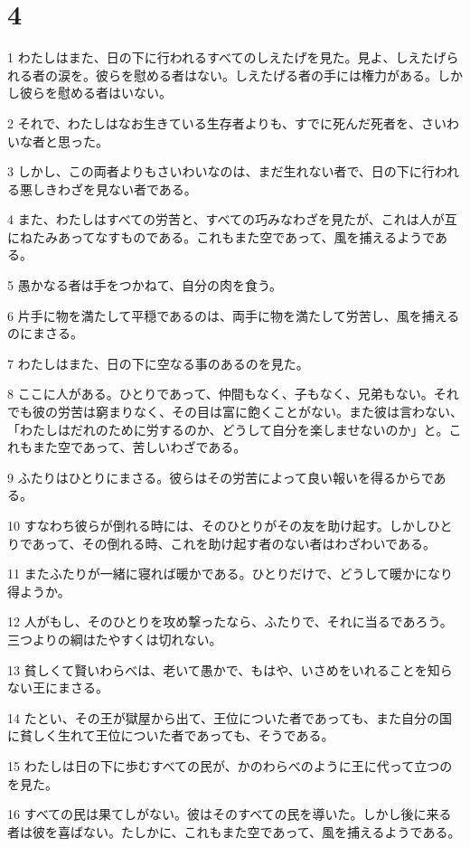 \chapter{4}

\par 1 わたしはまた、日の下に行われるすべてのしえたげを見た。見よ、しえたげられる者の涙を。彼らを慰める者はない。しえたげる者の手には権力がある。しかし彼らを慰める者はいない。
\par 2 それで、わたしはなお生きている生存者よりも、すでに死んだ死者を、さいわいな者と思った。
\par 3 しかし、この両者よりもさいわいなのは、まだ生れない者で、日の下に行われる悪しきわざを見ない者である。
\par 4 また、わたしはすべての労苦と、すべての巧みなわざを見たが、これは人が互にねたみあってなすものである。これもまた空であって、風を捕えるようである。
\par 5 愚かなる者は手をつかねて、自分の肉を食う。
\par 6 片手に物を満たして平穏であるのは、両手に物を満たして労苦し、風を捕えるのにまさる。
\par 7 わたしはまた、日の下に空なる事のあるのを見た。
\par 8 ここに人がある。ひとりであって、仲間もなく、子もなく、兄弟もない。それでも彼の労苦は窮まりなく、その目は富に飽くことがない。また彼は言わない、「わたしはだれのために労するのか、どうして自分を楽しませないのか」と。これもまた空であって、苦しいわざである。
\par 9 ふたりはひとりにまさる。彼らはその労苦によって良い報いを得るからである。
\par 10 すなわち彼らが倒れる時には、そのひとりがその友を助け起す。しかしひとりであって、その倒れる時、これを助け起す者のない者はわざわいである。
\par 11 またふたりが一緒に寝れば暖かである。ひとりだけで、どうして暖かになり得ようか。
\par 12 人がもし、そのひとりを攻め撃ったなら、ふたりで、それに当るであろう。三つよりの綱はたやすくは切れない。
\par 13 貧しくて賢いわらべは、老いて愚かで、もはや、いさめをいれることを知らない王にまさる。
\par 14 たとい、その王が獄屋から出て、王位についた者であっても、また自分の国に貧しく生れて王位についた者であっても、そうである。
\par 15 わたしは日の下に歩むすべての民が、かのわらべのように王に代って立つのを見た。
\par 16 すべての民は果てしがない。彼はそのすべての民を導いた。しかし後に来る者は彼を喜ばない。たしかに、これもまた空であって、風を捕えるようである。

